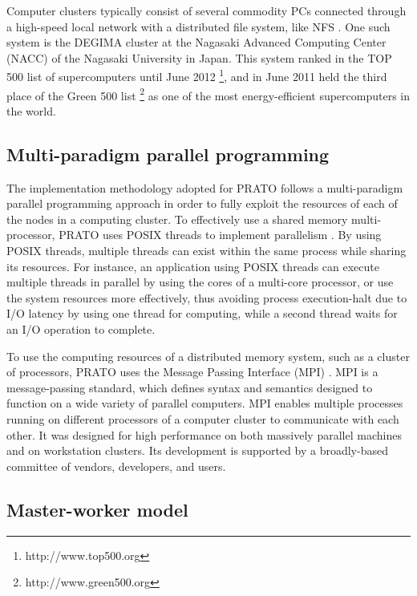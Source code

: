Computer clusters typically consist of several commodity PCs connected
through a high-speed local network with a distributed file system,
like NFS \cite{Shepler_Network_file_system:2003}. One such system
is the DEGIMA cluster \cite{Hamada_Cluster_of_GPUs:2010} at the Nagasaki
Advanced Computing Center (NACC) of the Nagasaki University in Japan.
This system ranked in the TOP 500 list of supercomputers until June
2012%
\footnote{http://www.top500.org%
}, and in June 2011 held the third place of the Green 500 list%
\footnote{http://www.green500.org%
} as one of the most energy-efficient supercomputers in the world.


\subsection{Multi-paradigm parallel programming}

The implementation methodology adopted for PRATO follows a multi-paradigm
parallel programming approach in order to fully exploit the resources
of each of the nodes in a computing cluster. To effectively use a
shared memory multi-processor, PRATO uses POSIX threads to implement
parallelism \cite{Butenhof_Programming.with.POSIX.threads:1997}.
By using POSIX threads, multiple threads can exist within the same
process while sharing its resources. For instance, an application
using POSIX threads can execute multiple threads in parallel by using
the cores of a multi-core processor, or use the system resources more
effectively, thus avoiding process execution-halt due to I/O latency
by using one thread for computing, while a second thread waits for
an I/O operation to complete. 

To use the computing resources of a distributed memory system, such
as a cluster of processors, PRATO uses the Message Passing Interface
(MPI) \cite{Gropp_Using_MPI:1999}. MPI is a message-passing standard,
which defines syntax and semantics designed to function on a wide
variety of parallel computers. MPI enables multiple processes running
on different processors of a computer cluster to communicate with
each other. It was designed for high performance on both massively
parallel machines and on workstation clusters. Its development is
supported by a broadly-based committee of vendors, developers, and
users.


\subsection{Master-worker model}

